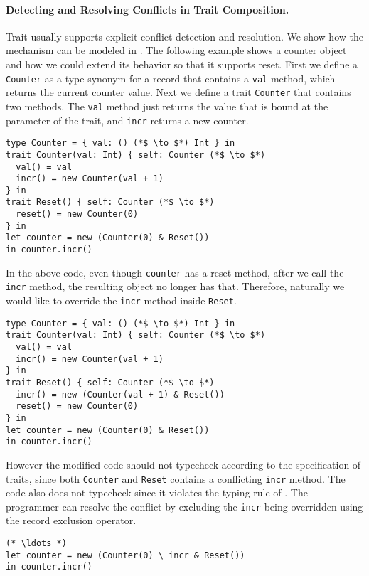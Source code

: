 \paragraph{Detecting and Resolving Conflicts in Trait Composition.}
Trait usually supports explicit conflict detection and resolution.
We show how the mechanism can be modeled in \name.
The following example shows a counter object and how we could extend its
behavior so that it supports reset. First we define a \lstinline$Counter$ as a
type synonym for a record that contains a \lstinline$val$ method, which returns
the current counter value. Next we define a trait \lstinline$Counter$ that
contains two methods. The \lstinline$val$ method just returns the value that is
bound at the parameter of the trait, and \lstinline$incr$ returns a new counter.
\begin{lstlisting}
type Counter = { val: () (*$ \to $*) Int } in
trait Counter(val: Int) { self: Counter (*$ \to $*)
  val() = val
  incr() = new Counter(val + 1)
} in
trait Reset() { self: Counter (*$ \to $*)
  reset() = new Counter(0)
} in
let counter = new (Counter(0) & Reset())
in counter.incr()
\end{lstlisting}

In the above code, even though \lstinline$counter$ has a reset method, after we
call the \lstinline$incr$ method, the resulting object no longer has that.
Therefore, naturally we would like to override the \lstinline$incr$ method
inside \lstinline$Reset$.

\begin{lstlisting}
type Counter = { val: () (*$ \to $*) Int } in
trait Counter(val: Int) { self: Counter (*$ \to $*)
  val() = val
  incr() = new Counter(val + 1)
} in
trait Reset() { self: Counter (*$ \to $*)
  incr() = new (Counter(val + 1) & Reset())
  reset() = new Counter(0)
} in
let counter = new (Counter(0) & Reset())
in counter.incr()
\end{lstlisting}

However the modified code should not typecheck according to the specification of
traits, since both \lstinline$Counter$ and \lstinline$Reset$ contains a
conflicting \lstinline$incr$ method. The code also does not typecheck since it
violates the typing rule of \name. The programmer can resolve the conflict by
excluding the \lstinline$incr$ being overridden using the record exclusion
operator.

\begin{lstlisting}
(* \ldots *)
let counter = new (Counter(0) \ incr & Reset())
in counter.incr()
\end{lstlisting}

